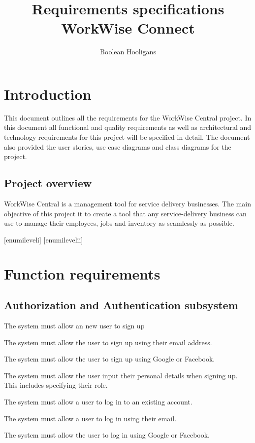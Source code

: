 \documentclass{article}
\title{%
	Requirements specifications \\
	\large WorkWise Connect}
\author{Boolean Hooligans}
\begin{document}
	
	\maketitle
	\newpage
	
	\section*{Introduction}	
	
	This document outlines all the requirements for the WorkWise Central project. In this document all functional and quality requirements as well as architectural and technology requirements for this project will be specified in detail. The document also provided the user stories, use case diagrams and class diagrams for the project. 
	
	\subsection*{Project overview}	
	WorkWise Central is a management tool for service delivery businesses. The main objective of this project it to create a tool that any service-delivery business can use to manage their employees, jobs and inventory as seamlessly as possible.  
	
	\newpage
	
	[enumileveli]
	[enumilevelii]
	
	
	\section*{Function requirements}
	\subsection*{Authorization and Authentication subsystem}	
	\begin{list}{R.}{}
		\item The system must allow an new user to sign up
		\begin{list}{R.}{}
			\item The system must allow the user to sign up using their email address.
			\item The system must allow the user to sign up using Google or Facebook.
			\item The system must allow the user input their personal details when signing up. This includes specifying their role.
		\end{list}
		\item The system must allow a user to log in to an existing account.
		\begin{list}{R.}{}
			\item The system must allow a user to log in using their email.
			\item The system must allow the user to log in using Google or Facebook.
		\end{list}
	\end{list}
	
\end{document}
